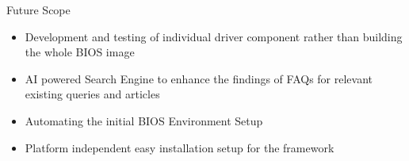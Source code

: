 \begin{frame}{Future Scope}
    \begin{itemize}
      \item Development and testing of individual driver component rather than building the whole BIOS image
      \item AI powered Search Engine to enhance the findings of FAQs for relevant existing queries and articles
      \item Automating the initial BIOS Environment Setup
      \item Platform independent easy installation setup for the framework
    \end{itemize}
\end{frame}